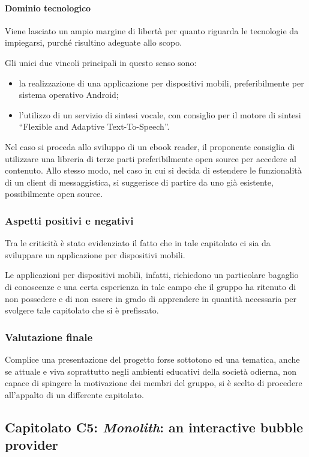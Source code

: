 			\paragraph{Dominio tecnologico}
			Viene lasciato un ampio margine di libertà per quanto riguarda le tecnologie da impiegarsi, purché risultino adeguate allo scopo. 

			Gli unici due vincoli principali in questo senso sono:
			\begin{itemize}
			\item la realizzazione di una applicazione per dispositivi mobili, preferibilmente per sistema operativo Android;
			\item l'utilizzo di un servizio di sintesi vocale, con consiglio per il motore di sintesi “Flexible and Adaptive Text-To-Speech”.
			\end{itemize}
			Nel caso si proceda allo sviluppo di un ebook reader, il proponente consiglia di utilizzare una libreria di terze parti preferibilmente 
			open source per accedere al contenuto. Allo stesso modo, nel caso in cui si decida di estendere le funzionalità di un client di messaggistica, 
			si suggerisce di partire da uno già esistente, possibilmente open source.
		\subsubsection{Aspetti positivi e negativi}
		Tra le criticità è stato evidenziato il fatto che in tale capitolato ci sia da sviluppare un applicazione per dispositivi mobili.

		Le applicazioni per dispositivi mobili, infatti, richiedono un particolare bagaglio di conoscenze e una certa esperienza in tale campo che il gruppo ha ritenuto di non possedere e di non essere in grado di apprendere in quantità necessaria per svolgere tale capitolato che si è prefissato.
		
		\subsubsection{Valutazione finale}
		Complice una presentazione del progetto forse sottotono ed una tematica, anche se attuale e viva soprattutto negli ambienti educativi della società odierna, non capace di spingere la motivazione dei membri del gruppo, si è scelto di procedere all'appalto di un differente capitolato.
		
	\subsection{Capitolato C5: \emph{Monolith}: an interactive bubble provider}

